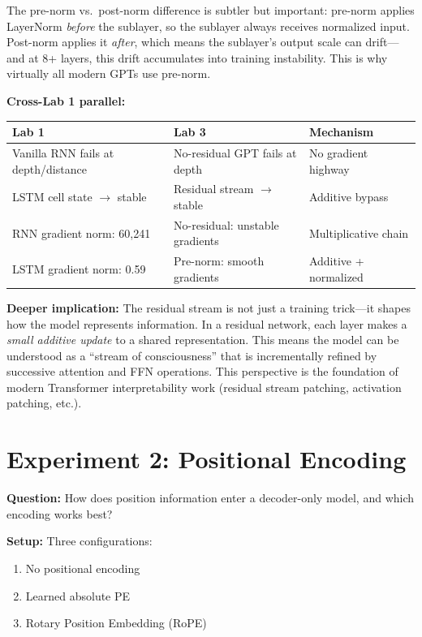 The pre-norm vs.\ post-norm difference is subtler but important: pre-norm applies LayerNorm \emph{before} the sublayer, so the sublayer always receives normalized input. Post-norm applies it \emph{after}, which means the sublayer's output scale can drift---and at 8+ layers, this drift accumulates into training instability. This is why virtually all modern GPTs use pre-norm.

\textbf{Cross-Lab 1 parallel:}
\begin{center}
\begin{tabular}{lll}
\toprule
\textbf{Lab 1} & \textbf{Lab 3} & \textbf{Mechanism} \\
\midrule
Vanilla RNN fails at depth/distance & No-residual GPT fails at depth & No gradient highway \\
LSTM cell state $\to$ stable & Residual stream $\to$ stable & Additive bypass \\
RNN gradient norm: 60,241 & No-residual: unstable gradients & Multiplicative chain \\
LSTM gradient norm: 0.59 & Pre-norm: smooth gradients & Additive + normalized \\
\bottomrule
\end{tabular}
\end{center}

\textbf{Deeper implication:} The residual stream is not just a training trick---it shapes how the model represents information. In a residual network, each layer makes a \emph{small additive update} to a shared representation. This means the model can be understood as a ``stream of consciousness'' that is incrementally refined by successive attention and FFN operations. This perspective is the foundation of modern Transformer interpretability work (residual stream patching, activation patching, etc.).

\section{Experiment 2: Positional Encoding}

\textbf{Question:} How does position information enter a decoder-only model, and which encoding works best?

\textbf{Setup:} Three configurations:
\begin{enumerate}[label=(\Alph*)]
\item No positional encoding
\item Learned absolute PE
\item Rotary Position Embedding (RoPE)
\end{enumerate}

